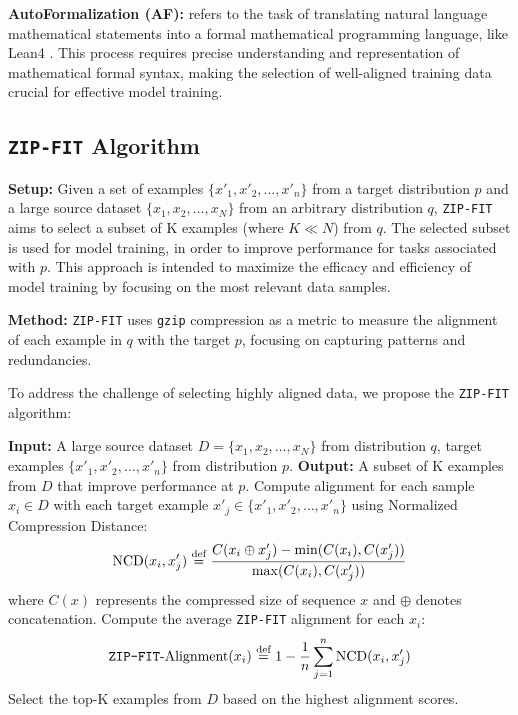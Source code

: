 \textbf{AutoFormalization (AF):} refers to the task of translating natural language mathematical statements into a formal mathematical programming language, like Lean4 \cite{deMoura2015lean}. 
This process requires precise understanding and representation of mathematical formal syntax, making the selection of well-aligned training data crucial for effective model training.

\subsection{\texttt{ZIP-FIT} Algorithm}

\textbf{Setup:} Given a set of examples \(\{x'_1, x'_2, \ldots, x'_n\}\) from a target distribution \(p\) 
and a large source dataset \(\{x_1, x_2, \ldots, x_N\}\) from an arbitrary distribution \(q\), \texttt{ZIP-FIT} aims to select a subset of K examples (where \(K \ll N\)) from \(q\). The selected subset is used for model training, in order to improve performance for tasks associated with \(p\). This approach is intended to maximize the efficacy and efficiency of model training by focusing on the most relevant data samples.

\textbf{Method:} \texttt{ZIP-FIT} uses \texttt{gzip} compression as a metric to measure the alignment of each example in \(q\) with the target \(p\), focusing on capturing patterns and redundancies.

To address the challenge of selecting highly aligned data, we propose the \texttt{ZIP-FIT} algorithm:

\begin{algorithm}
\caption{\texttt{ZIP-FIT} Data Selection Algorithm}
\begin{algorithmic}[1]
\State \textbf{Input:} A large source dataset \(D = \{x_1, x_2, \dots, x_N\}\) from distribution \(q\), target examples \(\{x'_1, x'_2, \dots, x'_n\}\) from distribution \(p\).
\State \textbf{Output:} A subset of K examples from \(D\) that improve performance at \(p\).
    \State Compute alignment for each sample \(x_i \in D\) with each target example 
    \Statex \hspace{\algorithmicindent}\(x'_j \in \{x'_1, x'_2, \dots, x'_n\}\) using Normalized Compression Distance:
    \Statex \[ \text{NCD}(x_i, x'_j) \operatorname{\stackrel{\text{def}}{\;=\;}} \frac{C(x_i \oplus x'_j) - \min(C(x_i), C(x'_j))}{\max(C(x_i), C(x'_j))} \]
    \Statex \hspace{\algorithmicindent}where \(C(x)\) represents the compressed size of sequence \(x\) and \(\oplus\) denotes concatenation.
    \State Compute the average \texttt{ZIP-FIT} alignment for each \(x_i\):
    \[ \text{\texttt{ZIP-FIT}-Alignment}(x_i) \operatorname{\stackrel{\text{def}}{\;=\;}} 1 - \frac{1}{n} \sum_{j=1}^{n} \text{NCD}(x_i, x'_j) \]
\EndFor
\State Select the top-K examples from \(D\) based on the highest alignment scores.
\end{algorithmic}
\end{algorithm}

